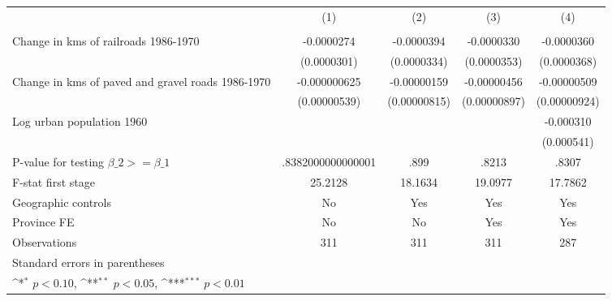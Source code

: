 {
\def\sym#1{\ifmmode^{#1}\else\(^{#1}\)\fi}
\begin{tabular}{l*{4}{c}}
\hline\hline
                &\multicolumn{1}{c}{(1)}&\multicolumn{1}{c}{(2)}&\multicolumn{1}{c}{(3)}&\multicolumn{1}{c}{(4)}\\
                &\multicolumn{1}{c}{}&\multicolumn{1}{c}{}&\multicolumn{1}{c}{}&\multicolumn{1}{c}{}\\
\hline
Change in kms of railroads 1986-1970&-0.0000274         &-0.0000394         &-0.0000330         &-0.0000360         \\
                &(0.0000301)         &(0.0000334)         &(0.0000353)         &(0.0000368)         \\
[1em]
Change in kms of paved and gravel roads 1986-1970&-0.000000625         &-0.00000159         &-0.00000456         &-0.00000509         \\
                &(0.00000539)         &(0.00000815)         &(0.00000897)         &(0.00000924)         \\
[1em]
Log urban population 1960&                  &                  &                  &-0.000310         \\
                &                  &                  &                  &(0.000541)         \\
\hline
P-value for testing $\beta\_{2} >= \beta\_{1}$&.8382000000000001         &     .899         &    .8213         &    .8307         \\
F-stat first stage&  25.2128         &  18.1634         &  19.0977         &  17.7862         \\
Geographic controls&       No         &      Yes         &      Yes         &      Yes         \\
Province FE     &       No         &       No         &      Yes         &      Yes         \\
Observations    &      311         &      311         &      311         &      287         \\
\hline\hline
\multicolumn{5}{l}{\footnotesize Standard errors in parentheses}\\
\multicolumn{5}{l}{\footnotesize \sym{*} \(p<0.10\), \sym{**} \(p<0.05\), \sym{***} \(p<0.01\)}\\
\end{tabular}
}
